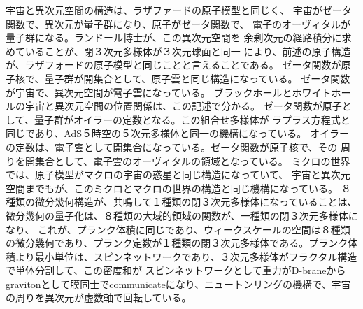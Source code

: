 \documentclass{jsarticle}
\begin{document}
\title{}		
\author{}
\date{}
\maketitle

  宇宙と異次元空間の構造は、ラザファードの原子模型と同じく、
宇宙がゼータ関数で、異次元が量子群になり、原子がゼータ関数で、
電子のオーヴィタルが量子群になる。ランドール博士が、この異次元空間を
余剰次元の経路積分に求めていることが、閉３次元多様体が３次元球面と同一
により、前述の原子構造が、ラザフォードの原子模型と同じことと言えることである。 
ゼータ関数が原子核で、量子群が開集合として、原子雲と同じ構造になっている。	
ゼータ関数が宇宙で、異次元空間が電子雲になっている。
ブラックホールとホワイトホールの宇宙と異次元空間の位置関係は、この記述で分かる。
ゼータ関数が原子として、量子群がオイラーの定数となる。この組合せ多様体が
ラプラス方程式と同じであり、AdS５時空の５次元多様体と同一の機構になっている。
オイラーの定数は、電子雲として開集合になっている。ゼータ関数が原子核で、その
周りを開集合として、電子雲のオーヴィタルの領域となっている。
ミクロの世界では、原子模型がマクロの宇宙の惑星と同じ構造になっていて、
宇宙と異次元空間までもが、このミクロとマクロの世界の構造と同じ機構になっている。
８種類の微分幾何構造が、共鳴して１種類の閉３次元多様体になっていることは、
微分幾何の量子化は、８種類の大域的領域の関数が、一種類の閉３次元多様体になり、
これが、プランク体積に同じであり、ウィークスケールの空間は８種類の微分幾何であり、プランク定数が１種類の閉３次元多様体である。プランク体積より最小単位は、スピンネットワークであり、３次元多様体がフラクタル構造で単体分割して、この密度和が
スピンネットワークとして重力がD-braneからgravitonとして膜同士でcommunicateになり、ニュートンリングの機構で、宇宙の周りを異次元が虚数軸で回転している。
\end{document}
